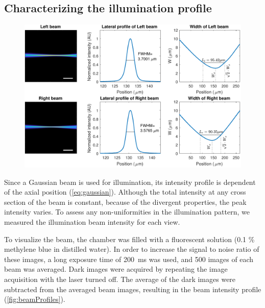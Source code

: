     

  \subsection{Characterizing the illumination profile}

    \begin{figure}[bthp]
      \centering
      \includegraphics[width=\textwidth]{beamPlots.pdf}
      \label{fig:beamProfiles}
    \end{figure}

    Since a Gaussian beam is used for illumination, its intensity profile is dependent of the axial position (\autoref{eq:gaussian}). Although the total intensity at any cross section of the beam is constant, because of the divergent properties, the peak intensity varies. To assess any non-uniformities in the illumination pattern, we measured the illumination beam intensity for each view.

    To visualize the beam, the chamber was filled with a fluorescent solution (0.1 \% methylene blue in distilled water). In order to increase the signal to noise ratio of these images, a long exposure time of \SI{200}{ms} was used, and 500 images of each beam was averaged. Dark images were acquired by repeating the image acquisition with the laser turned off. The average of the dark images were subtracted from the averaged beam images, resulting in the beam intensity profile (\autoref{fig:beamProfiles}).

